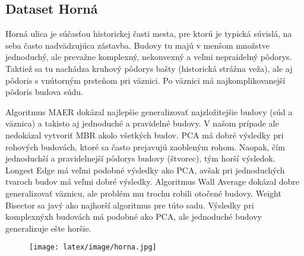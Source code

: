 \documentclass[12pt]{article}
\begin{document}
\subsection*{Dataset Horná}
Horná ulica je súčasťou historickej časti mesta, pre ktorú je typická súvislá, na seba často nadvädzujúca zástavba. Budovy tu majú v menšom množstve jednoduchý, ale prevažne komplexný, nekonvexný a veľmi nepraidelný pôdorys. Taktiež sa tu nachádza kruhový pôdorys bašty (historická strážna veža), ale aj pôdoris s vnútorným prsteňom pri väznici. Po väznici má najkomplikovanejší pôdoris budova súdu.

\par
Algoritmus MAER dokázal najlepšie generalizovať najzložitejšie budovy (súd a väznica) a takisto aj jednoduché a pravidelné budovy. V našom prípade ale nedokázal vytvoriť MBR akolo všetkých budov. PCA má dobré výsledky pri rohových budovách, ktoré sa často prejavujú zaobleným rohom. Naopak, čím jednoduchší a pravidelnejší pôdorys budovy (štvorec), tým horší výsledok. Longest Edge má veľmi podobné výsledky ako PCA, avšak pri jednoduchých tvaroch budov má veľmi dobré výsledky. Algoritmus Wall Average dokázal dobre generalizovať väznicu, ale problém mu trochu robili otočené budovy. Weight Bisector sa javý ako najhorší algoritmus pre túto sadu. Výsledky pri komplexnýxh budovách má podobné ako PCA, ale jednoduché budovy generalizuje ešte horšie.
\begin{figure}[h]
    \centering
    \texttt{[image: latex/image/horna.jpg]}
    \label{fig:enter-label}
\end{figure}
$$$$ 
\end{document}
